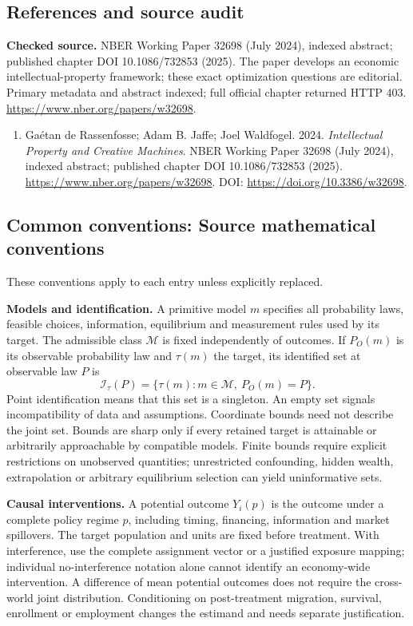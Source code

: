 \documentclass[11pt,a4paper]{article}
\begin{document}
\subsection*{References and source audit}
\textbf{Checked source.} NBER Working Paper 32698 (July 2024), indexed abstract; published chapter DOI 10.1086/732853 (2025). The paper develops an economic intellectual-property framework; these exact optimization questions are editorial. Primary metadata and abstract indexed; full official chapter returned HTTP 403. \url{https://www.nber.org/papers/w32698}.
\begin{enumerate}\raggedright
\item\hypertarget{definitions:source:30007697:1}{} Gaétan de Rassenfosse; Adam B. Jaffe; Joel Waldfogel. 2024. \emph{Intellectual Property and Creative Machines}. NBER Working Paper 32698 (July 2024), indexed abstract; published chapter DOI 10.1086/732853 (2025).
\url{https://www.nber.org/papers/w32698}.
DOI: \url{https://doi.org/10.3386/w32698}.
\end{enumerate}

\subsection*{Common conventions: Source mathematical conventions}

These conventions apply to each entry unless explicitly replaced.

\textbf{Models and identification.} A primitive model \(m\) specifies all probability laws, feasible choices, information, equilibrium and measurement rules used by its target. The admissible class \(\mathcal M\) is fixed independently of outcomes. If \(P_O(m)\) is its observable probability law and \(\tau(m)\) the target, its identified set at observable law \(P\) is
\[
 \mathcal I_\tau(P)=\{\tau(m):m\in\mathcal M,\ P_O(m)=P\}.
\]
Point identification means that this set is a singleton. An empty set signals incompatibility of data and assumptions. Coordinate bounds need not describe the joint set. Bounds are sharp only if every retained target is attainable or arbitrarily approachable by compatible models. Finite bounds require explicit restrictions on unobserved quantities; unrestricted confounding, hidden wealth, extrapolation or arbitrary equilibrium selection can yield uninformative sets.

\textbf{Causal interventions.} A potential outcome \(Y_i(p)\) is the outcome under a complete policy regime \(p\), including timing, financing, information and market spillovers. The target population and units are fixed before treatment. With interference, use the complete assignment vector or a justified exposure mapping; individual no-interference notation alone cannot identify an economy-wide intervention. A difference of mean potential outcomes does not require the cross-world joint distribution. Conditioning on post-treatment migration, survival, enrollment or employment changes the estimand and needs separate justification.
\end{document}
